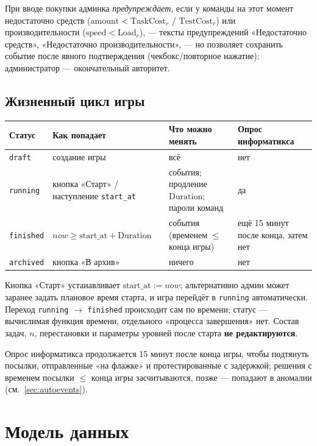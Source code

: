 \documentclass[12pt,a4paper]{article}
\newcommand{\field}[1]{\texttt{#1}}
\newcommand{\btn}[1]{«#1»}
\begin{document}
При вводе покупки админка \emph{предупреждает}, если у команды на этот момент
недостаточно средств ($\mathrm{amount} < \mathrm{TaskCost}_r$ /
$\mathrm{TestCost}_r$) или производительности
($\mathrm{speed} < \mathrm{Load}_r$), --- тексты предупреждений
«Недостаточно средств», «Недостаточно производительности», --- но позволяет
сохранить событие после явного подтверждения (чекбокс/повторное нажатие):
администратор --- окончательный авторитет.

\subsection{Жизненный цикл игры}

\begin{center}
\begin{tabular}{@{}llll@{}}
\toprule
\textbf{Статус} & \textbf{Как попадает} & \textbf{Что можно менять} & \textbf{Опрос информатикса} \\
\midrule
\field{draft} & создание игры & всё & нет \\
\field{running} & кнопка \btn{Старт} / наступление \field{start\_at} & события; продление $\mathrm{Duration}$; пароли команд & да \\
\field{finished} & $now \ge \mathrm{start\_at} + \mathrm{Duration}$ & события (временем $\le$ конца игры) & ещё 15 минут после конца, затем нет \\
\field{archived} & кнопка \btn{В архив} & ничего & нет \\
\bottomrule
\end{tabular}
\end{center}

Кнопка \btn{Старт} устанавливает $\mathrm{start\_at} := now$; альтернативно
админ может заранее задать плановое время старта, и игра перейдёт в
\field{running} автоматически. Переход \field{running} $\to$ \field{finished}
происходит сам по времени; статус --- вычислимая функция времени, отдельного
«процесса завершения» нет. Состав задач, $n$, перестановки и параметры
уровней после старта \textbf{не редактируются}.

Опрос информатикса продолжается 15 минут после конца игры, чтобы подтянуть
посылки, отправленные «на флажке» и протестированные с задержкой; решения
с временем посылки $\le$ конца игры засчитываются, позже --- попадают в
аномалии (см.~\ref{sec:autoevents}).

\section{Модель данных}
\label{sec:data}
\end{document}
